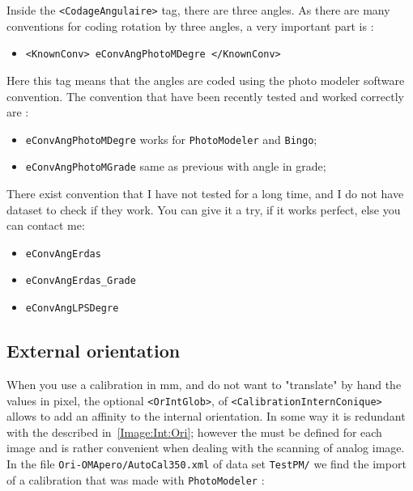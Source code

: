 Inside the {\tt  <CodageAngulaire>} tag, there are three angles. As there are many
conventions for coding rotation by three angles, a very important part is :

\begin{itemize}
      \item {\tt <KnownConv> eConvAngPhotoMDegre </KnownConv>}
\end{itemize}

Here this tag means that the angles are coded using the photo modeler software convention.
The convention that have been recently tested and worked correctly are :

\begin{itemize}
      \item {\tt eConvAngPhotoMDegre}  works for {\tt PhotoModeler} and {\tt Bingo};
      \item {\tt eConvAngPhotoMGrade}  same as previous with angle in grade;
\end{itemize}

There exist convention that I have not tested for a long time, and I do not have dataset to
check if they work. You can give it a try, if it works perfect, else you can contact me:

\begin{itemize}
    \item {\tt eConvAngErdas}
    \item {\tt eConvAngErdas\_Grade}
    \item {\tt eConvAngLPSDegre}
\end{itemize}


\subsection{External orientation}

When you use a calibration in mm, and do not want to "translate" by hand the values
in pixel, the optional {\tt <OrIntGlob>},  of {\tt <CalibrationInternConique>} allows
to add an affinity to the internal orientation. In some way it is redundant with the
{\tt <OrIntImaM2C>} described in~\ref{Image:Int:Ori}; however the {\tt <OrIntImaM2C>}
must be defined for each image and is rather convenient when dealing with the
scanning of analog image. In the file {\tt  Ori-OMApero/AutoCal350.xml} of  data set
{\tt TestPM/}  we find the import of a calibration that was made with {\tt PhotoModeler} :

